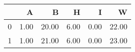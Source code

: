 \begin{table}[ht]
\begin{center}
\begin{tabular}{rrrrrr}
  \hline
 & A & B & H & I & W \\ 
  \hline
0 & 1.00 & 20.00 & 6.00 & 0.00 & 22.00 \\ 
  1 & 1.00 & 21.00 & 6.00 & 0.00 & 23.00 \\ 
   \hline
\end{tabular}
\end{center}
\end{table}
